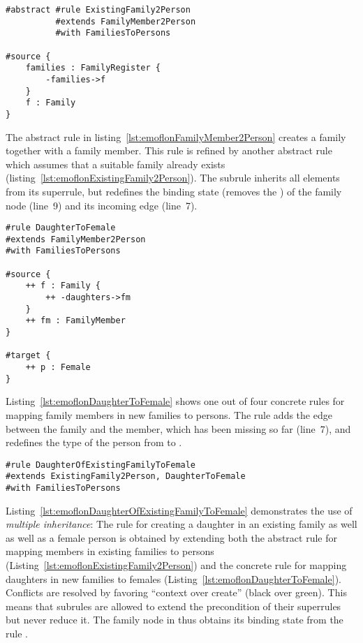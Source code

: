 \begin{lstlisting}[label={lst:emoflonExistingFamily2Person}, float=tb!, language=emoflon, caption={Mapping members in existing families to persons}]
#abstract #rule ExistingFamily2Person 
          #extends FamilyMember2Person 
          #with FamiliesToPersons

#source { 
    families : FamilyRegister {
        -families->f
    }
    f : Family
}
\end{lstlisting}

The abstract rule in listing~\ref{lst:emoflonFamilyMember2Person} creates a family together with a family member.
This rule is refined by another abstract rule which assumes that a suitable family already exists (listing~\ref{lst:emoflonExistingFamily2Person}).
The subrule inherits all elements from its superrule, but redefines the binding state (removes the \code{++}) of the family node (line~9) and its incoming edge (line~7).

\begin{lstlisting}[label={lst:emoflonDaughterToFemale}, float=tb!, language=emoflon, caption={Mapping daughters to female persons}]
#rule DaughterToFemale 
#extends FamilyMember2Person 
#with FamiliesToPersons

#source { 
    ++ f : Family {
        ++ -daughters->fm
    }
    ++ fm : FamilyMember
}

#target {
    ++ p : Female
}
\end{lstlisting}

Listing~\ref{lst:emoflonDaughterToFemale} shows one out of four concrete rules for mapping family members in new families to persons.
The rule adds the edge between the family and the member, which has been missing so far (line~7), and redefines the type of the person from  to .

\begin{lstlisting}[label={lst:emoflonDaughterOfExistingFamilyToFemale}, float=tb!, language=emoflon, caption={Mapping daughters in existing families to females}]
#rule DaughterOfExistingFamilyToFemale
#extends ExistingFamily2Person, DaughterToFemale
#with FamiliesToPersons
\end{lstlisting}

Listing~\ref{lst:emoflonDaughterOfExistingFamilyToFemale} demonstrates the use of \emph{multiple inheritance}: The rule for creating a daughter in an existing family as well as well as a female person is obtained by extending both the abstract rule for mapping members in existing families to persons (Listing~\ref{lst:emoflonExistingFamily2Person}) and the concrete rule for mapping daughters in new families to females (Listing~\ref{lst:emoflonDaughterToFemale}).
Conflicts are resolved by favoring ``context over create'' (black over green).
This means that subrules are allowed to extend the precondition of their superrules but never reduce it.
The family node  in  thus obtains its binding state from the rule .

